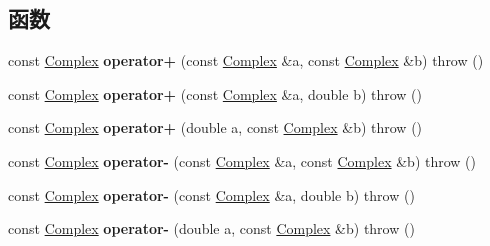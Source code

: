 \subsection*{函数}
\begin{DoxyCompactItemize}
\item 
\mbox{\label{namespacekerbal_1_1math_af8aca2e511716a7e1cccb0f71278b1a9}} 
const \hyperlink{classkerbal_1_1math_1_1_complex}{Complex} {\bfseries operator+} (const \hyperlink{classkerbal_1_1math_1_1_complex}{Complex} \&a, const \hyperlink{classkerbal_1_1math_1_1_complex}{Complex} \&b)  throw ()
\item 
\mbox{\label{namespacekerbal_1_1math_ac07ba22fae8e4c90ebd1707fec763ed3}} 
const \hyperlink{classkerbal_1_1math_1_1_complex}{Complex} {\bfseries operator+} (const \hyperlink{classkerbal_1_1math_1_1_complex}{Complex} \&a, double b)  throw ()
\item 
\mbox{\label{namespacekerbal_1_1math_aef4acdad20e15cd21e904e05e7203646}} 
const \hyperlink{classkerbal_1_1math_1_1_complex}{Complex} {\bfseries operator+} (double a, const \hyperlink{classkerbal_1_1math_1_1_complex}{Complex} \&b)  throw ()
\item 
\mbox{\label{namespacekerbal_1_1math_a384834c9c0a4b750983007a7fa01e4ab}} 
const \hyperlink{classkerbal_1_1math_1_1_complex}{Complex} {\bfseries operator-\/} (const \hyperlink{classkerbal_1_1math_1_1_complex}{Complex} \&a, const \hyperlink{classkerbal_1_1math_1_1_complex}{Complex} \&b)  throw ()
\item 
\mbox{\label{namespacekerbal_1_1math_a6bf7892b7ff5640315937b9f4b6711f8}} 
const \hyperlink{classkerbal_1_1math_1_1_complex}{Complex} {\bfseries operator-\/} (const \hyperlink{classkerbal_1_1math_1_1_complex}{Complex} \&a, double b)  throw ()
\item 
\mbox{\label{namespacekerbal_1_1math_a27cc2235ebc4214ff2a9034d1e7e5adf}} 
const \hyperlink{classkerbal_1_1math_1_1_complex}{Complex} {\bfseries operator-\/} (double a, const \hyperlink{classkerbal_1_1math_1_1_complex}{Complex} \&b)  throw ()
\item 
\mbox{\label{namespacekerbal_1_1math_afa9095585c369deed0a95aaf1c5dba9f}} 

\end{DoxyCompactItemize}
